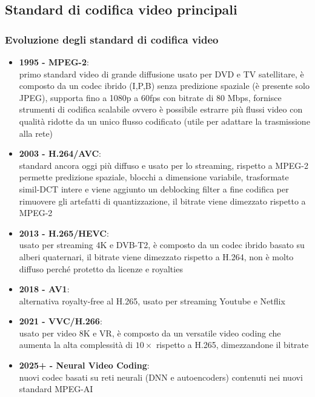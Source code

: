 \newpage

\subsection{Standard di codifica video principali}
\subsubsection*{Evoluzione degli standard di codifica video}
\begin{itemize}[itemsep=2pt]
	\item \textbf{1995 - MPEG-2}: \\
	primo standard video di grande diffusione usato per DVD e TV satellitare, è composto da un codec ibrido (I,P,B) senza
	predizione spaziale (è presente solo JPEG), supporta fino a 1080p a 60fps con bitrate di 80 Mbps, fornisce strumenti di
	codifica scalabile ovvero è possibile estrarre più flussi video con qualità ridotte da un unico flusso codificato (utile
	per adattare la trasmissione alla rete)
	\item \textbf{2003 - H.264/AVC}: \\
	standard ancora oggi più diffuso e usato per lo streaming, rispetto a MPEG-2 permette predizione spaziale, blocchi a
	dimensione variabile, trasformate simil-DCT intere e viene aggiunto un deblocking filter a fine codifica per rimuovere
	gli artefatti di quantizzazione, il bitrate viene dimezzato rispetto a MPEG-2
	\item \textbf{2013 - H.265/HEVC}: \\
	usato per streaming 4K e DVB-T2, è composto da un codec ibrido basato su alberi quaternari, il bitrate viene dimezzato
	rispetto a H.264, non è molto diffuso perché protetto da licenze e royalties
	\item \textbf{2018 - AV1}: \\
	alternativa royalty-free al H.265, usato per streaming Youtube e Netflix
	\item \textbf{2021 - VVC/H.266}: \\
	usato per video 8K e VR, è composto da un versatile video coding che aumenta la alta complessità di \(10\times\) rispetto
	a H.265, dimezzandone il bitrate
	\item \textbf{2025+ - Neural Video Coding}: \\
	nuovi codec basati su reti neurali (DNN e autoencoders) contenuti nei nuovi standard MPEG-AI
\end{itemize}

